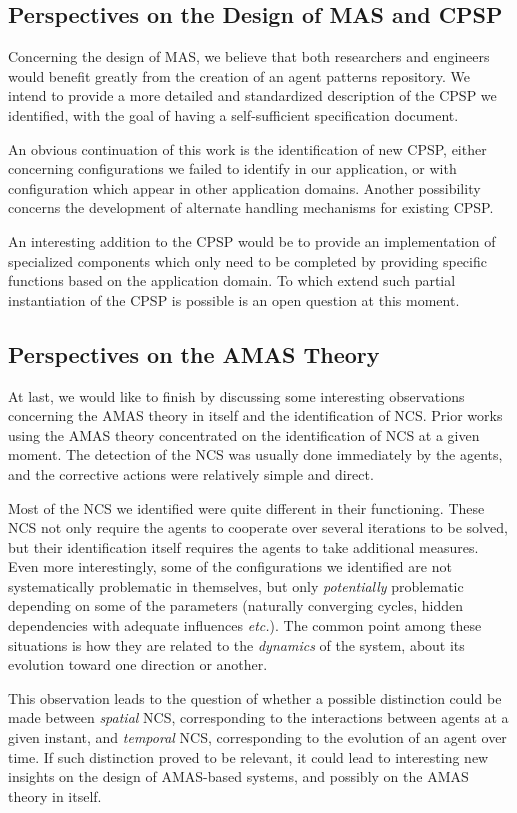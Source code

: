 \subsection*{Perspectives on the Design of MAS and CPSP}

Concerning the design of MAS, we believe that both researchers and engineers would benefit greatly from the creation of an agent patterns repository. We intend to provide a more detailed and standardized description of the CPSP we identified, with the goal of having a self-sufficient specification document.

An obvious continuation of this work is the identification of new CPSP, either concerning configurations we failed to identify in our application, or with configuration which appear in other application domains. Another possibility concerns the development of alternate handling mechanisms for existing CPSP.

An interesting addition to the CPSP would be to provide an implementation of specialized components which only need to be completed by providing specific functions based on the application domain. To which extend such partial instantiation of the CPSP is possible is an open question at this moment.

\subsection*{Perspectives on the AMAS Theory}

At last, we would like to finish by discussing some interesting observations concerning the AMAS theory in itself and the identification of NCS. Prior works using the AMAS theory concentrated on the identification of NCS at a given moment. The detection of the NCS was usually done immediately by the agents, and the corrective actions were relatively simple and direct.

Most of the NCS we identified were quite different in their functioning. These NCS not only require the agents to cooperate over several iterations to be solved, but their identification itself requires the agents to take additional measures. Even more interestingly, some of the configurations we identified are not systematically problematic in themselves, but only \emph{potentially} problematic depending on some of the parameters (naturally converging cycles, hidden dependencies with adequate influences \emph{etc.}). The common point among these situations is how they are related to the \emph{dynamics} of the system, about its evolution toward one direction or another.

This observation leads to the question of whether a possible distinction could be made between \emph{spatial} NCS, corresponding to the interactions between agents at a given instant, and \emph{temporal} NCS, corresponding to the evolution of an agent over time. If such distinction proved to be relevant, it could lead to interesting new insights on the design of AMAS-based systems, and possibly on the AMAS theory in itself.

